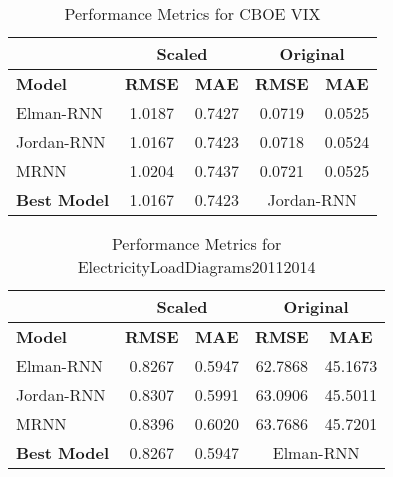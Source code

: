 \documentclass[conference, 10pt]{IEEEtran}
\begin{document}
\begin{table}[h]
    \centering
    \begin{tabular}{|l|c|c|c|c|}
        \hline
        &\multicolumn{2}{c|}{\textbf{Scaled}} & \multicolumn{2}{c|}{\textbf{Original}} \\ 
        \hline
        \textbf{Model}& \textbf{RMSE} & \textbf{MAE} & \textbf{RMSE} & \textbf{MAE} \\ 
        \hline
        Elman-RNN& 1.0187 & 0.7427 & 0.0719 & 0.0525 \\ 
        \hline
        Jordan-RNN & 1.0167 & 0.7423 & 0.0718 & 0.0524 \\ 
        \hline
        MRNN & 1.0204 & 0.7437 & 0.0721 & 0.0525 \\ 
        \hline
        \textbf{Best Model} & 1.0167 & 0.7423 & \multicolumn{2}{c|}{{Jordan-RNN}} \\ 
        \hline
    \end{tabular}
    \vspace{4pt}
    \caption{Performance Metrics for CBOE VIX}
    \label{tab:results_vix}
\end{table}

\begin{table}[h]
    \centering
    \begin{tabular}{|l|c|c|c|c|}
        \hline
        &\multicolumn{2}{c|}{\textbf{Scaled}} & \multicolumn{2}{c|}{\textbf{Original}} \\ 
        \hline
        \textbf{Model}& \textbf{RMSE} & \textbf{MAE} & \textbf{RMSE} & \textbf{MAE} \\ 
        \hline
        Elman-RNN& 0.8267 & 0.5947 & 62.7868 & 45.1673 \\ 
        \hline
        Jordan-RNN & 0.8307 & 0.5991 & 63.0906 & 45.5011 \\ 
        \hline
        MRNN & 0.8396 & 0.6020 & 63.7686 & 45.7201 \\ 
        \hline
        \textbf{Best Model} & 0.8267 & 0.5947 & \multicolumn{2}{c|}{{Elman-RNN}}\\ 
        \hline
    \end{tabular}
    \vspace{4pt}
    \caption{Performance Metrics for ElectricityLoadDiagrams20112014}
    \label{tab:results_elec}
\end{table}
\end{document}
